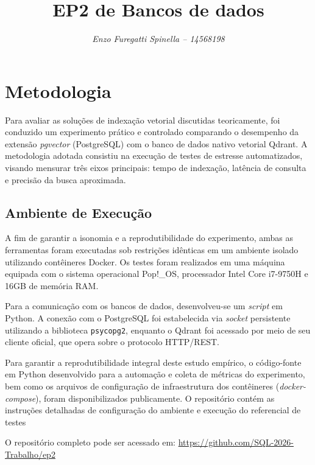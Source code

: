 \documentclass[a4paper, 12pt]{article} %
\title{\textbf{EP2 de Bancos de dados}}
\author{\small\textit{ Enzo Furegatti Spinella -- 14568198}}
\begin{document}
\maketitle


\section{Metodologia}
\label{sec:metodologia}

Para avaliar as soluções de indexação vetorial discutidas teoricamente, foi conduzido um experimento prático e controlado comparando o desempenho da extensão \textit{pgvector} (PostgreSQL) com o banco de dados nativo vetorial Qdrant. A metodologia adotada consistiu na execução de testes de estresse automatizados, visando mensurar três eixos principais: tempo de indexação, latência de consulta e precisão da busca aproximada.

\subsection{Ambiente de Execução}
A fim de garantir a isonomia e a reprodutibilidade do experimento, ambas as ferramentas foram executadas sob restrições idênticas em um ambiente isolado utilizando contêineres Docker. Os testes foram realizados em uma máquina equipada com o sistema operacional Pop!\_OS, processador Intel Core i7-9750H e 16GB de memória RAM.

Para a comunicação com os bancos de dados, desenvolveu-se um \textit{script} em Python. A conexão com o PostgreSQL foi estabelecida via \textit{socket} persistente utilizando a biblioteca \texttt{psycopg2}, enquanto o Qdrant foi acessado por meio de seu cliente oficial, que opera sobre o protocolo HTTP/REST.

Para garantir a reprodutibilidade integral deste estudo empírico, o código-fonte em Python desenvolvido para a automação e coleta de métricas do experimento, bem como os arquivos de configuração de infraestrutura dos contêineres (\textit{docker-compose}), foram disponibilizados publicamente. O repositório contém as instruções detalhadas de configuração do ambiente e execução do referencial de testes

O repositório completo pode ser acessado em: \url{https://github.com/SQL-2026-Trabalho/ep2}
\end{document}
